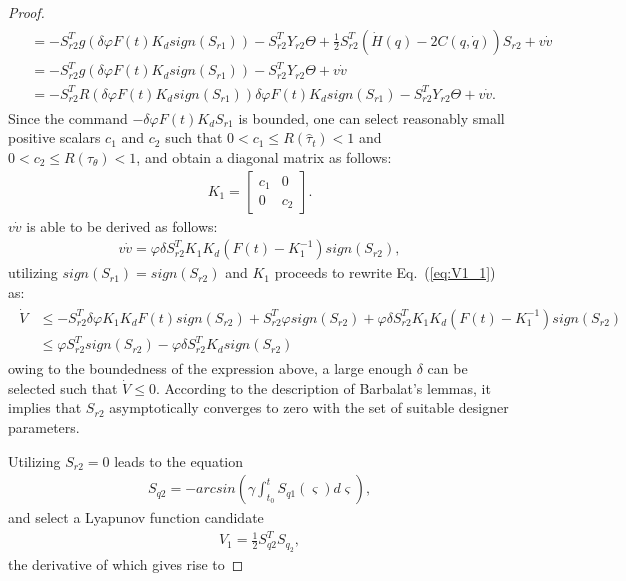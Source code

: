 \documentclass[Journal,letterpaper]{ascelike-new}
\theoremstyle{plain}
\theoremstyle{remark}
\begin{document}
\begin{proof}
\begin{align}
\begin{split}
&= -S_{r2}^Tg(\delta\varphi F(t) K_dsign(S_{r1}))-S_{r2}^TY_{r2}\Theta+\frac{1}{2}S_{r2}^T(\dot H(q)-2C(q,\dot q))S_{r2}+v\dot v\\
&= -S_{r2}^Tg(\delta\varphi F(t) K_dsign(S_{r1}))-S_{r2}^TY_{r2}\Theta+v\dot v\\
&= -S_{r2}^TR(\delta\varphi F(t) K_dsign(S_{r1}))\delta\varphi F(t) K_dsign(S_{r1})-S_{r2}^TY_{r2}\Theta+v\dot v.\label{eq:V1_1}
\end{split}
\end{align}
Since the command $ -\delta\varphi F(t) K_dS_{r1}$ is bounded, one can select reasonably small positive scalars $c_1$ and $c_2$ such that $0<c_1\le R(\hat\tau_t)<1$ and $0<c_2\le R(\hat\tau_\theta)<1$, and obtain a diagonal matrix as follows:
\begin{align}
K_1 = \begin{bmatrix}c_1&0\\0&c_2\end{bmatrix}.\label{eq:saturated ratio}
\end{align}
$v\dot v$ is able to be derived as follows:
\begin{align}
v\dot v =\varphi\delta S_{r2}^T K_1K_d(F(t)-K_1^{-1})sign(S_{r2}),
\end{align}
utilizing $sign(S_{r1})=sign(S_{r2})$ and $K_1$ proceeds to rewrite Eq.~(\ref{eq:V1_1}) as:
\begin{align}
\begin{split}\label{eq:V1_2}
\dot V&\le -S_{r2}^T\delta\varphi  K_1K_dF(t)sign(S_{r2})+S_{r2}^T\varphi sign(S_{r2})+\varphi\delta S_{r2}^T K_1K_d(F(t)-K_1^{-1})sign(S_{r2})\\
&\le \varphi S_{r2}^Tsign(S_{r2})-\varphi\delta S_{r2}^T K_dsign(S_{r2})
\end{split}
\end{align}
owing to the boundedness of the expression above, a large enough $\delta$ can be selected such that $\dot V \le 0$. According to the description of Barbalat’s lemmas, it implies that $S_{r2}$ asymptotically converges to zero with the set of suitable designer parameters.\par
Utilizing $S_{r2}=0$ leads to the equation
\begin{align}
S_{q2}=-arcsin(\gamma\int^t_{t_0}S_{q1}(\varsigma) d\varsigma),\label{eq:eqSq2}
\end{align}
and select a Lyapunov function candidate
\begin{align}
V_1 = \frac{1}{2}S_{q2}^TS_{q_2},
\end{align}
the derivative of which gives rise to

\end{proof}
\end{document}
